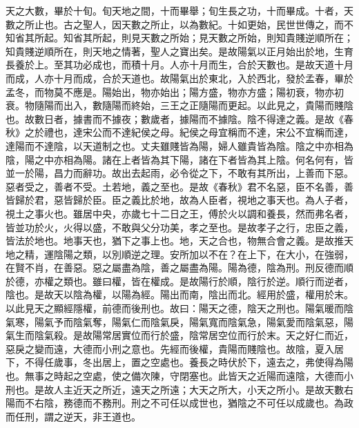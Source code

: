 天之大數，畢於十旬。旬天地之間，十而畢舉；旬生長之功，十而畢成。十者，天數之所止也。古之聖人，因天數之所止，以為數紀。十如更始，民世世傳之，而不知省其所起。知省其所起，則見天數之所始；見天數之所始，則知貴賤逆順所在；知貴賤逆順所在，則天地之情著，聖人之寶出矣。是故陽氣以正月始出於地，生育長養於上。至其功必成也，而積十月。人亦十月而生，合於天數也。是故天道十月而成，人亦十月而成，合於天道也。故陽氣出於東北，入於西北，發於孟春，畢於孟冬，而物莫不應是。陽始出，物亦始出；陽方盛，物亦方盛；陽初衰，物亦初衰。物隨陽而出入，數隨陽而終始，三王之正隨陽而更起。以此見之，貴陽而賤陰也。故數日者，據書而不據夜；數歲者，據陽而不據陰。陰不得達之義。是故《春秋》之於禮也，達宋公而不達紀侯之母。紀侯之母宜稱而不達，宋公不宜稱而達，達陽而不達陰，以天道制之也。丈夫雖賤皆為陽，婦人雖貴皆為陰。陰之中亦相為陰，陽之中亦相為陽。諸在上者皆為其下陽，諸在下者皆為其上陰。何名何有，皆並一於陽，昌力而辭功。故出去起雨，必令從之下，不敢有其所出，上善而下惡。惡者受之，善者不受。土若地，義之至也。是故《春秋》君不名惡，臣不名善，善皆歸於君，惡皆歸於臣。臣之義比於地，故為人臣者，視地之事天也。為人子者，視土之事火也。雖居中央，亦歲七十二日之王，傅於火以調和養長，然而弗名者，皆並功於火，火得以盛，不敢與父分功美，孝之至也。是故孝子之行，忠臣之義，皆法於地也。地事天也，猶下之事上也。地，天之合也，物無合會之義。是故推天地之精，運陰陽之類，以別順逆之理。安所加以不在？在上下，在大小，在強弱，在賢不肖，在善惡。惡之屬盡為陰，善之屬盡為陽。陽為德，陰為刑。刑反德而順於德，亦權之類也。雖曰權，皆在權成。是故陽行於順，陰行於逆。順行而逆者，陰也。是故天以陰為權，以陽為經。陽出而南，陰出而北。經用於盛，權用於末。以此見天之顯經隱權，前德而後刑也。故曰：陽天之德，陰天之刑也。陽氣暖而陰氣寒，陽氣予而陰氣奪，陽氣仁而陰氣戾，陽氣寬而陰氣急，陽氣愛而陰氣惡，陽氣生而陰氣殺。是故陽常居實位而行於盛，陰常居空位而行於末。天之好仁而近，惡戾之變而遠，大德而小刑之意也。先經而後權，貴陽而賤陰也。故陰，夏入居下，不得任歲事，冬出居上，置之空處也。養長之時伏於下，遠去之，弗使得為陽也。無事之時起之空處，使之備次陳，守閉塞也。此皆天之近陽而遠陰，大德而小刑也。是故人主近天之所近，遠天之所遠；大天之所大，小天之所小。是故天數右陽而不右陰，務德而不務刑。刑之不可任以成世也，猶陰之不可任以成歲也。為政而任刑，謂之逆天，非王道也。


